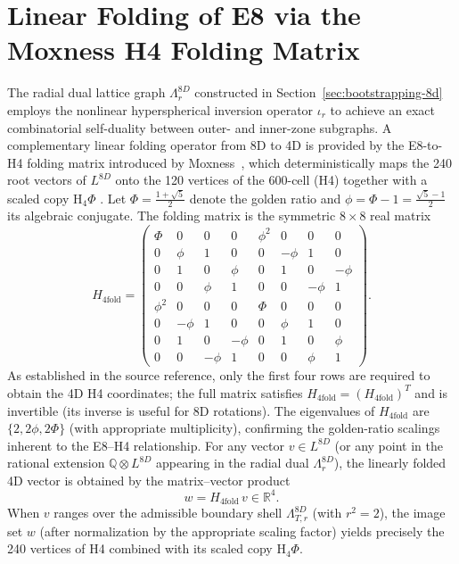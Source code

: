 \documentclass{article}
\begin{document}
\section{Linear Folding of E8 via the Moxness H4 Folding Matrix}
\label{sec:h4-folding}
The radial dual lattice graph \(\Lambda_r^{8D}\) constructed in Section~\ref{sec:bootstrapping-8d} employs the nonlinear hyperspherical inversion operator \(\iota_r\) to achieve an exact combinatorial self-duality between outer- and inner-zone subgraphs. A complementary linear folding operator from 8D to 4D is provided by the E8-to-H4 folding matrix introduced by Moxness~\cite{Moxness2014}, which deterministically maps the 240 root vectors of \(L^{8D}\) onto the 120 vertices of the 600-cell (H4) together with a scaled copy \(\mathrm{H}_4\Phi\) \cite{ElserSloane1987,Coxeter1973}.
Let \(\Phi = \frac{1 + \sqrt{5}}{2}\) denote the golden ratio and \(\phi = \Phi - 1 = \frac{\sqrt{5} - 1}{2}\) its algebraic conjugate. The folding matrix is the symmetric \(8 \times 8\) real matrix
\begin{equation}
H_{4\mathrm{fold}} =
\begin{pmatrix}
\Phi & 0 & 0 & 0 & \phi^2 & 0 & 0 & 0 \\
0 & \phi & 1 & 0 & 0 & -\phi & 1 & 0 \\
0 & 1 & 0 & \phi & 0 & 1 & 0 & -\phi \\
0 & 0 & \phi & 1 & 0 & 0 & -\phi & 1 \\
\phi^2 & 0 & 0 & 0 & \Phi & 0 & 0 & 0 \\
0 & -\phi & 1 & 0 & 0 & \phi & 1 & 0 \\
0 & 1 & 0 & -\phi & 0 & 1 & 0 & \phi \\
0 & 0 & -\phi & 1 & 0 & 0 & \phi & 1
\end{pmatrix}.
\label{eq:H4fold}
\end{equation}
As established in the source reference, only the first four rows are required to obtain the 4D H4 coordinates; the full matrix satisfies \(H_{4\mathrm{fold}} = (H_{4\mathrm{fold}})^T\) and is invertible (its inverse is useful for 8D rotations). The eigenvalues of \(H_{4\mathrm{fold}}\) are \(\{2,2\phi,2\Phi\}\) (with appropriate multiplicity), confirming the golden-ratio scalings inherent to the E8–H4 relationship.
For any vector \(v \in L^{8D}\) (or any point in the rational extension \(\mathbb{Q} \otimes L^{8D}\) appearing in the radial dual \(\Lambda_r^{8D}\)), the linearly folded 4D vector is obtained by the matrix–vector product
\begin{equation}
w = H_{4\mathrm{fold}} \, v \in \mathbb{R}^4.
\end{equation}
When \(v\) ranges over the admissible boundary shell \(\Lambda_{T,r}^{8D}\) (with \(r^2 = 2\)), the image set \(w\) (after normalization by the appropriate scaling factor) yields precisely the 240 vertices of H4 combined with its scaled copy \(\mathrm{H}_4\Phi\).
\end{document}
